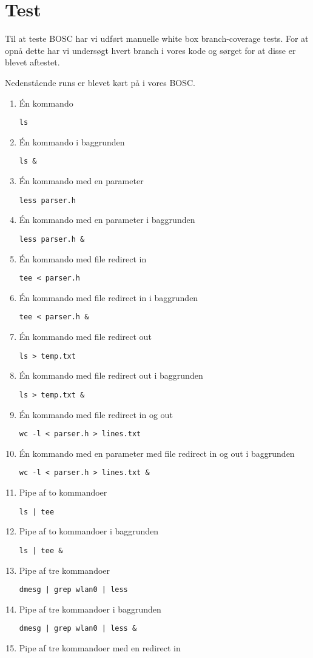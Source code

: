 \section{Test}
Til at teste BOSC har vi udført manuelle white box branch-coverage tests. For at opnå dette har vi undersøgt hvert branch i vores kode og sørget for at disse er blevet aftestet.

Nedenstående runs er blevet kørt på i vores BOSC.

\begin{enumerate}
	\item Én kommando
	
	\verb+ls+
	\item Én kommando i baggrunden
	
	\verb+ls &+
	\item Én kommando med en parameter
	
	\verb+less parser.h+
	\item Én kommando med en parameter i baggrunden
	
	\verb+less parser.h &+
	\item Én kommando med file redirect in
	
	\verb+tee < parser.h+
	\item Én kommando med file redirect in i baggrunden
	
	\verb+tee < parser.h &+
	\item Én kommando med file redirect out
	
	\verb+ls > temp.txt+
	\item Én kommando med file redirect out i baggrunden
	
	\verb+ls > temp.txt &+
	\item Én kommando med file redirect in og out
	
	\verb+wc -l < parser.h > lines.txt+
	\item Én kommando med en parameter med file redirect in og out i baggrunden
	
	\verb+wc -l < parser.h > lines.txt &+
	\item Pipe af to kommandoer
	
	\verb+ls | tee+
	\item Pipe af to kommandoer i baggrunden
	
	\verb+ls | tee &+
	\item Pipe af tre kommandoer
	
	\verb+dmesg | grep wlan0 | less+
	\item Pipe af tre kommandoer i baggrunden
	
	\verb+dmesg | grep wlan0 | less &+
	\item  Pipe af tre kommandoer med en redirect in
	

\end{enumerate}
